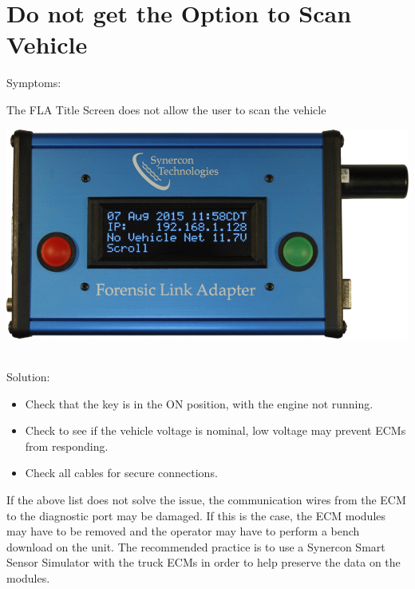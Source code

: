 \documentclass[11pt, oneside]{book}
\begin{document}
\section{Do not get the Option to Scan Vehicle}
Symptoms:\\
\noindent\begin{minipage}{0.45\textwidth}%
The FLA Title Screen does not allow the user to scan the vehicle
\end{minipage}%
\hfill%
\begin{minipage}{0.45\textwidth}
\includegraphics[width=\linewidth]{../media/fla_screens/ethernet_and_others/main/title_no_net}
\end{minipage}\\
Solution:\\
\begin{itemize}
\item Check that the key is in the ON position, with the engine not running.
\item Check to see if the vehicle voltage is nominal, low voltage may prevent ECMs from responding.
\item Check all cables for secure connections.
\end{itemize}
If the above list does not solve the issue, the communication wires from the ECM to the diagnostic port may be damaged. If this is the case, the ECM modules may have to be removed and the operator may have to perform a bench download on the unit. The recommended practice is to use a Synercon Smart Sensor Simulator with the truck ECMs in order to help preserve the data on the modules.
\end{document}

